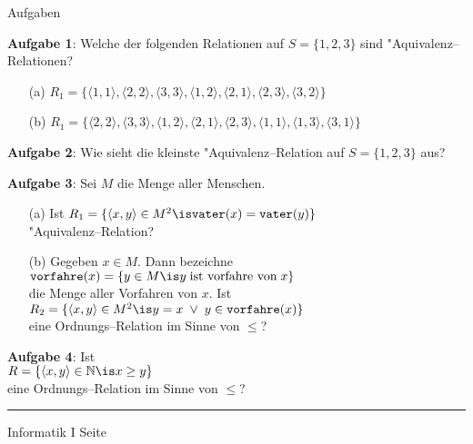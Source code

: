 \begin{slide}{}
\normalsize
\begin{center}
Aufgaben
\end{center}
\vspace{0.5cm}

\footnotesize
\textbf{Aufgabe 1}: Welche der folgenden Relationen auf $S = \{1, 2, 3\}$ sind "Aquivalenz--Relationen?
\begin{enumerate}
\item[(a)] $R_1 = \{ \langle 1, 1 \rangle,
                     \langle 2, 2 \rangle,
                     \langle 3, 3 \rangle,
                     \langle 1, 2 \rangle,
                     \langle 2, 1 \rangle,
                     \langle 2, 3 \rangle,
                     \langle 3, 2 \rangle \}$
\item[(b)] $R_1 = \{ \langle 2, 2 \rangle,
                     \langle 3, 3 \rangle,
                     \langle 1, 2 \rangle,
                     \langle 2, 1 \rangle,
                     \langle 2, 3 \rangle,
                     \langle 1, 1 \rangle,
                     \langle 1, 3 \rangle,
                     \langle 3, 1 \rangle \}$
\end{enumerate}

\textbf{Aufgabe 2}: Wie sieht die kleinste "Aquivalenz--Relation auf $S = \{1, 2, 3 \}$ aus?

\textbf{Aufgabe 3}: Sei $M$ die Menge aller Menschen.
\begin{enumerate}
\item[(a)] Ist  $R_1 = \{ \langle x, y \rangle \in M^2 \is \mathtt{vater}(x) = \mathtt{vater}(y) \}$ \\[0.3cm]
           "Aquivalenz--Relation?
\item[(b)] Gegeben $x \in M$. Dann bezeichne \\[0.1cm]
           \hspace*{1.3cm} $\mathtt{vorfahre}(x) = \{ y \in M \is y \;\mbox{ist vorfahre von}\; x \}$ \\[0.3cm]
           die Menge aller Vorfahren von $x$. Ist  \\[0.3cm]
           \hspace*{0.5cm} 
           $R_2 = \{ \langle x, y \rangle \in M^2 \is y = x \;\vee\; y \in
           \mathtt{vorfahre}(x) \}$ \\[0.3cm]
           eine Ordnungs--Relation im Sinne von $\leq$?
\end{enumerate}

\textbf{Aufgabe 4}: Ist \\[0.3cm]
\hspace*{1.3cm}  $R = \{ \langle x, y \rangle \in \mathbb{N} \is x \geq y \}$ \\[0.3cm]
eine Ordnungs--Relation im Sinne von $\leq$?


\vspace*{\fill}
\tiny \addtocounter{mypage}{1}
\rule{15cm}{1mm}
Informatik I  \hspace*{\fill} Seite 
\end{slide}


